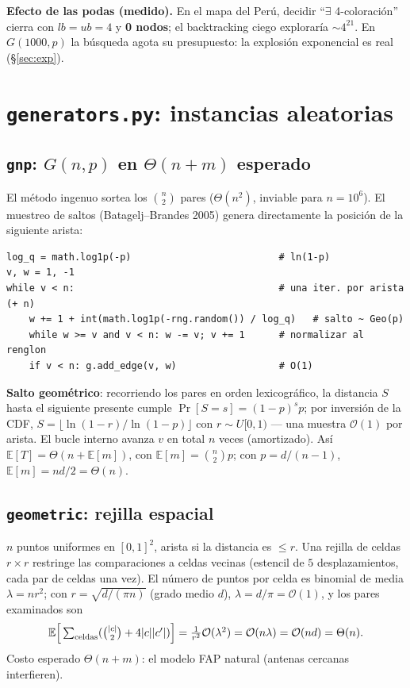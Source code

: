 \documentclass[11pt,a4paper]{article}
\theoremstyle{definition}
\theoremstyle{remark}
\newcommand{\bigO}{\mathcal{O}}
\begin{document}
\textbf{Efecto de las podas (medido).} En el mapa del Perú, decidir
``$\exists$ 4-coloración'' cierra con $lb=ub=4$ y \textbf{0 nodos}; el
backtracking ciego exploraría $\sim 4^{21}$. En $G(1000,p)$ la búsqueda agota su
presupuesto: la explosión exponencial es real (\S\ref{sec:exp}).

\section{\texttt{generators.py}: instancias aleatorias}\label{sec:gen}
\subsection{\texttt{gnp}: $G(n,p)$ en $\Theta(n+m)$ esperado}
El método ingenuo sortea los $\binom{n}{2}$ pares ($\Theta(n^2)$, inviable para
$n=10^6$). El muestreo de saltos (Batagelj--Brandes 2005) genera directamente la
posición de la siguiente arista:
\begin{lstlisting}
log_q = math.log1p(-p)                          # ln(1-p)
v, w = 1, -1
while v < n:                                    # una iter. por arista (+ n)
    w += 1 + int(math.log1p(-rng.random()) / log_q)   # salto ~ Geo(p)
    while w >= v and v < n: w -= v; v += 1      # normalizar al renglon
    if v < n: g.add_edge(v, w)                  # O(1)
\end{lstlisting}
\textbf{Salto geométrico}: recorriendo los pares en orden lexicográfico, la
distancia $S$ hasta el siguiente presente cumple $\Pr[S{=}s]=(1-p)^s p$; por
inversión de la CDF, $S=\lfloor\ln(1-r)/\ln(1-p)\rfloor$ con $r\sim U[0,1)$ ---
una muestra $\bigO(1)$ por arista. El bucle interno avanza $v$ en total $n$ veces
(amortizado). Así
$\mathbb{E}[T]=\Theta(n+\mathbb{E}[m])$, con $\mathbb{E}[m]=\binom{n}{2}p$; con
$p=d/(n-1)$, $\mathbb{E}[m]=nd/2=\Theta(n)$.

\subsection{\texttt{geometric}: rejilla espacial}
$n$ puntos uniformes en $[0,1]^2$, arista si la distancia es $\le r$. Una rejilla
de celdas $r\times r$ restringe las comparaciones a celdas vecinas (estencil de
$5$ desplazamientos, cada par de celdas una vez). El número de puntos por celda
es binomial de media $\lambda=nr^2$; con $r=\sqrt{d/(\pi n)}$ (grado medio $d$),
$\lambda=d/\pi=\bigO(1)$, y los pares examinados son
\[
\mathbb{E}\Big[\textstyle\sum_{\text{celdas}}(\tbinom{|c|}{2}+4|c||c'|)\Big]
=\tfrac{1}{r^2}\bigO(\lambda^2)=\bigO(n\lambda)=\bigO(nd)=\Theta(n).
\]
Costo esperado $\Theta(n+m)$: el modelo FAP natural (antenas cercanas interfieren).
\end{document}
